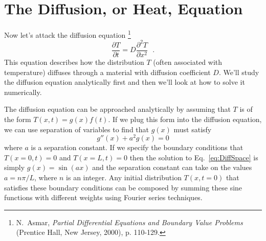 \chapter{The Diffusion, or Heat, Equation}
\label{Lab:17}


Now let's attack the diffusion equation \footnote{N.\
Asmar, {\it Partial Differential Equations and Boundary Value
Problems} (Prentice Hall, New Jersey, 2000), p. 110-129.}
\begin{equation}
    \frac{\partial T}{\partial t} = D \frac{\partial ^2 T}{\partial x^2}~~~.
    \label{diffusioneq}
\end{equation}
This equation describes how the distribution $T$ (often
associated with temperature) diffuses through a material with
diffusion coefficient $D$. We'll study the diffusion equation
analytically first and then we'll look at how to solve it
numerically.


The diffusion equation can be approached analytically by
assuming that $T$ is of the form $T(x,t) = g(x)f(t)$.  If we
plug this form into the diffusion equation, we can use
separation of variables to find that $g(x)$ must satisfy
\begin{equation}\label{eq:DiffSpace}
    g''(x) + a^2 g(x) = 0
\end{equation}
where $a$ is a separation constant.  If we specify the boundary
conditions that $T(x=0,t) = 0$ and $T(x=L,t) = 0$ then the
solution to Eq.~\eqref{eq:DiffSpace} is simply $g(x) =
\sin(ax)$ and the separation constant can take on the values
$a=n \pi / L$, where $n$ is an integer.  Any initial
distribution $T(x,t=0)$ that satisfies these boundary
conditions can be composed by summing these sine functions with
different weights using Fourier series techniques.

